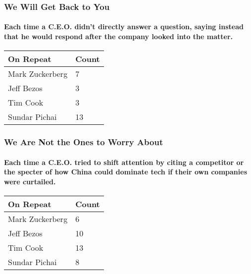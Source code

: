 \hypertarget{we-will-get-back-to-you}{%
\subsubsection{We Will Get Back to You}\label{we-will-get-back-to-you}}

\hypertarget{each-time-a-ceo-didnt-directly-answer-a-question-saying-instead-that-he-would-respond-after-the-company-looked-into-the-matter}{%
\paragraph{Each time a C.E.O. didn't directly answer a question, saying
instead that he would respond after the company looked into the
matter.}\label{each-time-a-ceo-didnt-directly-answer-a-question-saying-instead-that-he-would-respond-after-the-company-looked-into-the-matter}}

\begin{longtable}[]{@{}ll@{}}
\toprule
\textbf{On Repeat} & \textbf{Count}\tabularnewline
\midrule
\endhead
Mark Zuckerberg & 7\tabularnewline
Jeff Bezos & 3\tabularnewline
Tim Cook & 3\tabularnewline
Sundar Pichai & 13\tabularnewline
\bottomrule
\end{longtable}

\hypertarget{we-are-not-the-ones-to-worry-about}{%
\subsubsection{We Are Not the Ones to Worry
About}\label{we-are-not-the-ones-to-worry-about}}

\hypertarget{each-time-a-ceo-tried-to-shift-attention-by-citing-a-competitor-or-the-specter-of-how-china-could-dominate-tech-if-their-own-companies-were-curtailed}{%
\paragraph{Each time a C.E.O. tried to shift attention by citing a
competitor or the specter of how China could dominate tech if their own
companies were
curtailed.}\label{each-time-a-ceo-tried-to-shift-attention-by-citing-a-competitor-or-the-specter-of-how-china-could-dominate-tech-if-their-own-companies-were-curtailed}}

\begin{longtable}[]{@{}ll@{}}
\toprule
\textbf{On Repeat} & \textbf{Count}\tabularnewline
\midrule
\endhead
Mark Zuckerberg & 6\tabularnewline
Jeff Bezos & 10\tabularnewline
Tim Cook & 13\tabularnewline
Sundar Pichai & 8\tabularnewline
\bottomrule
\end{longtable}

